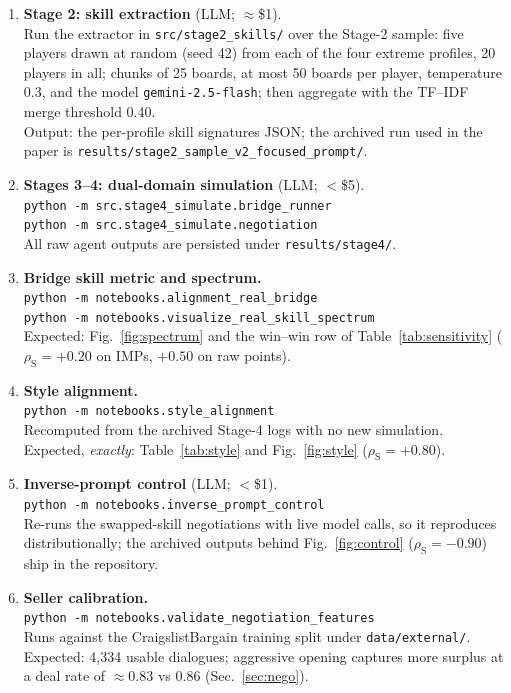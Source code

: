 \documentclass[runningheads]{llncs}
\newcommand{\rhoS}{\rho_{\mathrm{S}}}
\begin{document}
\begin{enumerate}
  membership-stability figures of Sec.~\ref{sec:validation}, and the
  strict-definition overlaps of Sec.~\ref{sec:validation} (Jaccard
  overlaps of 1.00, 0.14, 0.95, and 0.94, and $\rhoS=+0.80$ under the
  strict preempt definition). Passing \texttt{parity} instead of \texttt{match}
  reproduces the dealer-rotation artefact discussed in the text.
  \item \textbf{Stage 2: skill extraction} (LLM; $\approx$\$1).\\
  Run the extractor in \texttt{src/stage2\_skills/} over the Stage-2
  sample: five players drawn at random (seed 42) from each of the four
  extreme profiles, 20 players in all; chunks of 25 boards, at most 50
  boards per player, temperature 0.3, and the model
  \texttt{gemini-2.5-flash}; then aggregate with the TF--IDF merge
  threshold 0.40.\\
  Output: the per-profile skill signatures JSON; the archived run used
  in the paper is \texttt{results/stage2\_sample\_v2\_focused\_prompt/}.
  \item \textbf{Stages 3--4: dual-domain simulation} (LLM; $<$\$5).\\
  \texttt{python -m src.stage4\_simulate.bridge\_runner}\\
  \texttt{python -m src.stage4\_simulate.negotiation}\\
  All raw agent outputs are persisted under \texttt{results/stage4/}.
  \item \textbf{Bridge skill metric and spectrum.}\\
  \texttt{python -m notebooks.alignment\_real\_bridge}\\
  \texttt{python -m notebooks.visualize\_real\_skill\_spectrum}\\
  Expected: Fig.~\ref{fig:spectrum} and the win--win row of
  Table~\ref{tab:sensitivity} ($\rhoS=+0.20$ on IMPs, $+0.50$ on raw
  points).
  \item \textbf{Style alignment.}\\
  \texttt{python -m notebooks.style\_alignment}\\
  Recomputed from the archived Stage-4 logs with no new simulation.
  Expected, \emph{exactly}: Table~\ref{tab:style} and
  Fig.~\ref{fig:style} ($\rhoS=+0.80$).
  \item \textbf{Inverse-prompt control} (LLM; $<$\$1).\\
  \texttt{python -m notebooks.inverse\_prompt\_control}\\
  Re-runs the swapped-skill negotiations with live model calls, so it
  reproduces distributionally; the archived outputs behind
  Fig.~\ref{fig:control} ($\rhoS=-0.90$) ship in the repository.
  \item \textbf{Seller calibration.}\\
  \texttt{python -m notebooks.validate\_negotiation\_features}\\
  Runs against the CraigslistBargain training split under
  \texttt{data/external/}. Expected: 4{,}334 usable dialogues;
  aggressive opening captures more surplus at a deal rate of
  $\approx0.83$ vs $0.86$ (Sec.~\ref{sec:nego}).
\end{enumerate}
\end{document}
